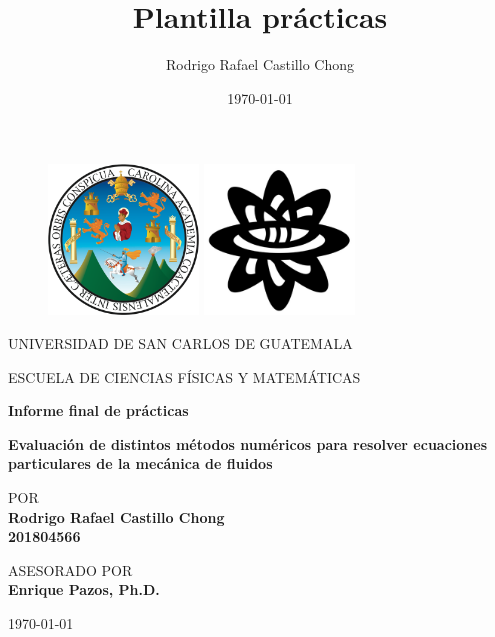 \documentclass[12pt]{article}
\title{Plantilla prácticas}
\author{Rodrigo Rafael Castillo Chong}
\date{\today}
\begin{document}
	
	\thispagestyle{empty}
	
	\begin{figure}[ht]
		\includegraphics[width=4cm]{images/usaclogo.png}
		\label{EscudoUSAC}
		\endminipage
		\includegraphics[height = 4cm ,width=4cm]{images/logoecfmplain.png}
		\label{EscudoECFM}
		\endminipage
	\end{figure}
	
	\begin{center}
		\vspace{0.8cm}
		\LARGE
		UNIVERSIDAD DE SAN CARLOS DE GUATEMALA
		
		\vspace{0.8cm}
		\LARGE
		ESCUELA DE CIENCIAS FÍSICAS Y MATEMÁTICAS
		
		\vspace{1.7cm}	
		\Large
		\textbf{Informe final de prácticas}
		
		\vspace{1.7cm}
		\Large
		\textbf{Evaluación de distintos métodos numéricos para resolver ecuaciones particulares de la mecánica de fluidos}
		
		
		\vspace{1.3cm}
		\normalsize	
		POR \\
		\vspace{.3cm}
		\large
		\textbf{Rodrigo Rafael Castillo Chong \\ 201804566}
		
		\vspace{1.3cm}
		\normalsize	
		ASESORADO POR \\
		\vspace{.3cm}
		\large
		\textbf{Enrique Pazos, Ph.D.}
		
		
		
		\vspace{1.3cm}
		\today
	\end{center}
	
\end{document}
